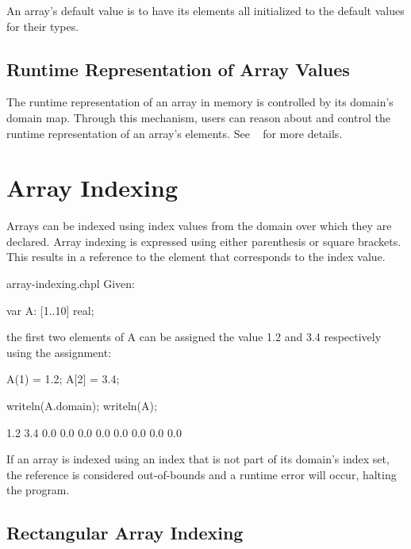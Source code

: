 
An array's default value is to have its elements all initialized to
the default values for their types.

\subsection{Runtime Representation of Array Values}
\label{Array_Runtime_Representation}

The runtime representation of an array in memory is controlled by its
domain's domain map.  Through this mechanism, users can reason about
and control the runtime representation of an array's elements.  See
~ for more details.


\section{Array Indexing}
\label{Array_Indexing}

Arrays can be indexed using index values from the domain over which
they are declared.  Array indexing is expressed using either
parenthesis or square brackets.  This results in a reference to the
element that corresponds to the index value.


\begin{chapelexample}{array-indexing.chpl}
Given:
\begin{chapel}
var A: [1..10] real;
\end{chapel}
the first two elements of A can be assigned the value 1.2 and 3.4
respectively using the assignment:
\begin{chapel}
A(1) = 1.2;
A[2] = 3.4;
\end{chapel}
\begin{chapelpost}
writeln(A.domain);
writeln(A);
\end{chapelpost}
\begin{chapeloutput}
[1..10]
1.2 3.4 0.0 0.0 0.0 0.0 0.0 0.0 0.0 0.0
\end{chapeloutput}
\end{chapelexample}

If an array is indexed using an index that is not part of its domain's
index set, the reference is considered out-of-bounds and a runtime
error will occur, halting the program.


\subsection{Rectangular Array Indexing}
\label{Rectangular_Array_Indexing}

